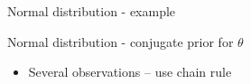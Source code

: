 \documentclass[english,t]{beamer}
\begin{document}
\begin{frame}{Normal distribution - example}

  
\end{frame}

\begin{frame}{Normal distribution - conjugate prior for $\theta$}

  \begin{itemize}
  \item Several observations -- use chain rule
  \end{itemize}

\end{frame}
\end{document}
